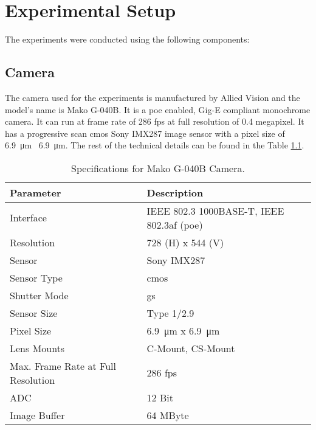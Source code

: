 \chapter{Experimental Setup}

The experiments were conducted using the following components:

\section{Camera}
    The camera used for the experiments is manufactured by Allied Vision and the model's name is Mako G-040B. It is a \gls{poe} enabled, Gig-E compliant monochrome camera. It can run at frame rate of 286 \gls{fps} at full resolution of 0.4 megapixel. It has a progressive scan \gls{cmos} Sony IMX287 image sensor with a pixel size of \SI{6.9}{\micro\meter} \times \ \SI{6.9}{\micro\meter}. The rest of the technical details can be found in the Table \ref{table:camera_specs}.

    \begin{table}[h]
        \centering
        \footnotesize
        \renewcommand{\arraystretch}{1.2}
        \begin{tabular}{p{6cm}p{7cm}}
            \toprule
            \textbf{Parameter} & \textbf{Description} \\
            \midrule
            Interface & IEEE 802.3 1000BASE-T, IEEE 802.3af (\gls{poe})\\
            Resolution & 728 (H) x 544 (V)\\
            Sensor & Sony IMX287\\
            Sensor Type & \gls{cmos}\\
            Shutter Mode & \gls{gs}\\
            Sensor Size & Type 1/2.9\\
            Pixel Size & \SI{6.9}{\micro\meter} x \SI{6.9}{\micro\meter}\\
            Lens Mounts & C-Mount, CS-Mount\\
            Max. Frame Rate at Full Resolution & 286 \gls{fps}\\
            ADC & 12 Bit\\
            Image Buffer & 64 MByte\\
            \bottomrule
        \end{tabular}
        \caption{Specifications for Mako G-040B Camera. \cite{mako_camera}}
        \label{table:camera_specs}
    \end{table}

